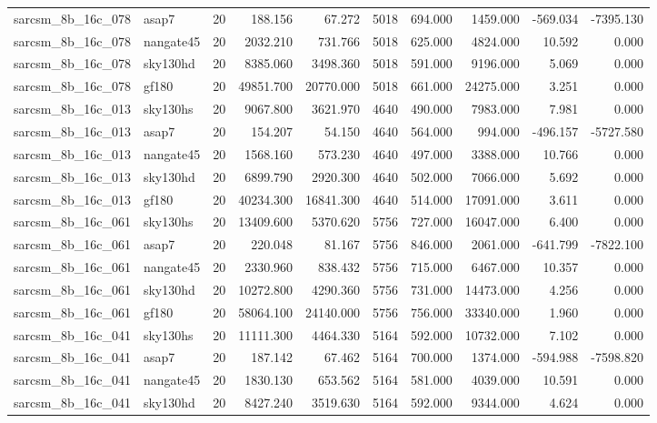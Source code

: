 \begin{tabular}{llrrrrrrrr}
sarcsm\_8b\_16c\_078 & asap7 & 20 & 188.156 & 67.272 & 5018 & 694.000 & 1459.000 & -569.034 & -7395.130 \\
sarcsm\_8b\_16c\_078 & nangate45 & 20 & 2032.210 & 731.766 & 5018 & 625.000 & 4824.000 & 10.592 & 0.000 \\
sarcsm\_8b\_16c\_078 & sky130hd & 20 & 8385.060 & 3498.360 & 5018 & 591.000 & 9196.000 & 5.069 & 0.000 \\
sarcsm\_8b\_16c\_078 & gf180 & 20 & 49851.700 & 20770.000 & 5018 & 661.000 & 24275.000 & 3.251 & 0.000 \\
sarcsm\_8b\_16c\_013 & sky130hs & 20 & 9067.800 & 3621.970 & 4640 & 490.000 & 7983.000 & 7.981 & 0.000 \\
sarcsm\_8b\_16c\_013 & asap7 & 20 & 154.207 & 54.150 & 4640 & 564.000 & 994.000 & -496.157 & -5727.580 \\
sarcsm\_8b\_16c\_013 & nangate45 & 20 & 1568.160 & 573.230 & 4640 & 497.000 & 3388.000 & 10.766 & 0.000 \\
sarcsm\_8b\_16c\_013 & sky130hd & 20 & 6899.790 & 2920.300 & 4640 & 502.000 & 7066.000 & 5.692 & 0.000 \\
sarcsm\_8b\_16c\_013 & gf180 & 20 & 40234.300 & 16841.300 & 4640 & 514.000 & 17091.000 & 3.611 & 0.000 \\
sarcsm\_8b\_16c\_061 & sky130hs & 20 & 13409.600 & 5370.620 & 5756 & 727.000 & 16047.000 & 6.400 & 0.000 \\
sarcsm\_8b\_16c\_061 & asap7 & 20 & 220.048 & 81.167 & 5756 & 846.000 & 2061.000 & -641.799 & -7822.100 \\
sarcsm\_8b\_16c\_061 & nangate45 & 20 & 2330.960 & 838.432 & 5756 & 715.000 & 6467.000 & 10.357 & 0.000 \\
sarcsm\_8b\_16c\_061 & sky130hd & 20 & 10272.800 & 4290.360 & 5756 & 731.000 & 14473.000 & 4.256 & 0.000 \\
sarcsm\_8b\_16c\_061 & gf180 & 20 & 58064.100 & 24140.000 & 5756 & 756.000 & 33340.000 & 1.960 & 0.000 \\
sarcsm\_8b\_16c\_041 & sky130hs & 20 & 11111.300 & 4464.330 & 5164 & 592.000 & 10732.000 & 7.102 & 0.000 \\
sarcsm\_8b\_16c\_041 & asap7 & 20 & 187.142 & 67.462 & 5164 & 700.000 & 1374.000 & -594.988 & -7598.820 \\
sarcsm\_8b\_16c\_041 & nangate45 & 20 & 1830.130 & 653.562 & 5164 & 581.000 & 4039.000 & 10.591 & 0.000 \\
sarcsm\_8b\_16c\_041 & sky130hd & 20 & 8427.240 & 3519.630 & 5164 & 592.000 & 9344.000 & 4.624 & 0.000 \\

\end{tabular}
